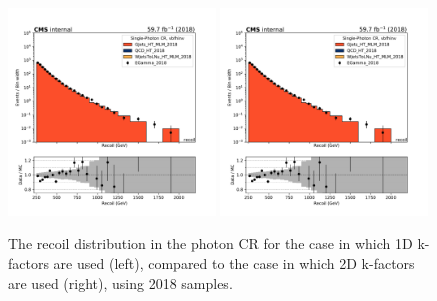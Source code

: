 \begin{figure}
    \begin{center}
        \includegraphics[width=0.49\textwidth]{fig/datamc/cr_g_vbf/cr_g_vbf_recoil_losf_2018.pdf}
        \includegraphics[width=0.49\textwidth]{fig/datamc_2dkfac/cr_g_vbf/cr_g_vbf_recoil_losf_2018.pdf} 
        \caption{The recoil distribution in the photon CR for the case in which 1D k-factors are used (left), 
        compared to the case in which 2D k-factors are used (right), using 2018 samples.}
        \label{fig:recoil_2018}
    \end{center}
\end{figure}

